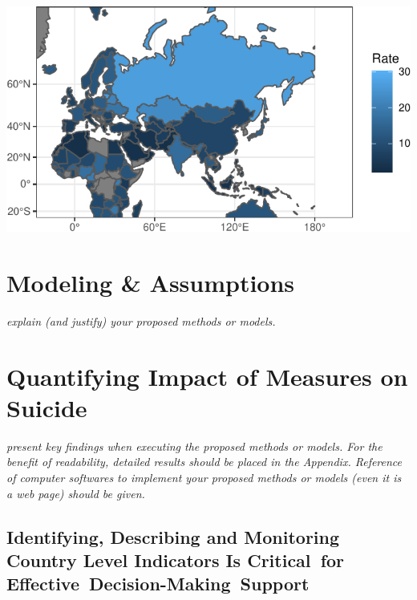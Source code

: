 \documentclass[]{article}
\begin{document}
\begin{center}\includegraphics{Project_Report_files/figure-latex/russia_map_plot-1} \end{center}

\section{Modeling \& Assumptions}\label{modeling-assumptions}

\emph{explain (and justify) your proposed methods or models.}

\section{Quantifying Impact of Measures on
Suicide}\label{quantifying-impact-of-measures-on-suicide}

\emph{present key findings when executing the proposed methods or
models. For the benefit of readability, detailed results should be
placed in the Appendix. Reference of computer softwares to implement
your proposed methods or models (even it is a web page) should be
given.}

\subsection{Identifying, Describing and Monitoring Country Level
Indicators Is Critical~for
Effective~Decision-Making~Support}\label{identifying-describing-and-monitoring-country-level-indicators-is-criticalfor-effectivedecision-makingsupport}
\end{document}

